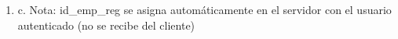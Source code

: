 \begin{enumerate}
\begin{enumerate}
\begin{enumerate}
\begin{enumerate}
                    \end{enumerate}
                \item v. id\_emp
                    \begin{enumerate}
                        \item 1. Number (entero)
                        \item 2. Requerido
                        \item 3. Debe existir en Empleado y estar operativo
                    \end{enumerate}
            \end{enumerate}
        \item c. Nota: id\_emp\_reg se asigna automáticamente en el servidor con el usuario autenticado (no se recibe del cliente)
    \end{enumerate}


\end{enumerate}
